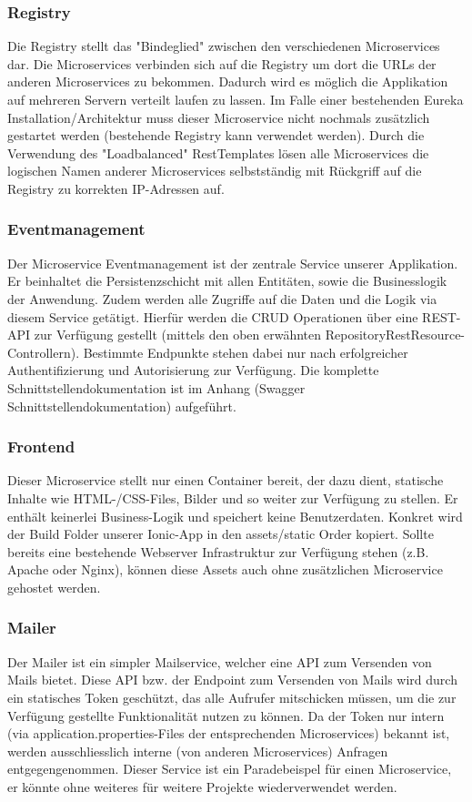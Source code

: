 \documentclass[11pt]{article} %
\begin{document}
\subsubsection{Registry}
Die Registry stellt das "Bindeglied" zwischen den verschiedenen Microservices dar. Die Microservices verbinden sich auf die Registry um dort die URLs der anderen Microservices zu bekommen. Dadurch wird es möglich die Applikation auf mehreren Servern verteilt laufen zu lassen. Im Falle einer bestehenden Eureka Installation/Architektur muss dieser Microservice nicht nochmals zusätzlich gestartet werden (bestehende Registry kann verwendet werden).
Durch die Verwendung des "Loadbalanced" RestTemplates lösen alle Microservices die logischen Namen anderer Microservices selbstständig mit Rückgriff auf die Registry zu korrekten IP-Adressen auf.

\subsubsection{Eventmanagement}
Der Microservice Eventmanagement ist der zentrale Service unserer Applikation. Er beinhaltet die Persistenzschicht mit allen Entitäten, sowie die Businesslogik der Anwendung. Zudem werden alle Zugriffe auf die Daten und die Logik via diesem Service getätigt. Hierfür werden die CRUD Operationen über eine REST-API zur Verfügung gestellt (mittels den oben erwähnten RepositoryRestResource-Controllern). Bestimmte Endpunkte stehen dabei nur nach erfolgreicher Authentifizierung und Autorisierung zur Verfügung. Die komplette Schnittstellendokumentation ist im Anhang (Swagger Schnittstellendokumentation) aufgeführt.

\subsubsection{Frontend}
Dieser Microservice stellt nur einen Container bereit, der dazu dient, statische Inhalte wie HTML-/CSS-Files, Bilder und so weiter zur Verfügung zu stellen. Er enthält keinerlei Business-Logik und speichert keine Benutzerdaten. Konkret wird der Build Folder unserer Ionic-App in den assets/static Order kopiert. Sollte bereits eine bestehende Webserver Infrastruktur zur Verfügung stehen (z.B. Apache oder Nginx), können diese Assets auch ohne zusätzlichen Microservice gehostet werden.

\subsubsection{Mailer}
Der Mailer ist ein simpler Mailservice, welcher eine API zum Versenden von Mails bietet. Diese API bzw. der Endpoint zum Versenden von Mails wird durch ein statisches Token geschützt, das alle Aufrufer mitschicken müssen, um die zur Verfügung gestellte Funktionalität nutzen zu können. Da der Token nur intern (via application.properties-Files der entsprechenden Microservices) bekannt ist, werden ausschliesslich interne (von anderen Microservices) Anfragen entgegengenommen. Dieser Service ist ein Paradebeispel für einen Microservice, er könnte ohne weiteres für weitere Projekte wiederverwendet werden.
\end{document}
